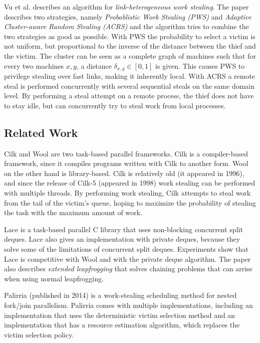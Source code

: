 Vu et al. \cite{6846471} describes an algorithm for \emph{link-heterogeneous work stealing}. The paper describes two strategies, namely \emph{Probablistic Work Stealing (PWS)} and \emph{Adaptive Cluster-aware Random Stealing (ACRS)} and the algorithm tries to combine the two strategies as good as possible. With PWS the probability to select a victim is not uniform, but proportional to the inverse of the distance between the thief and the victim. The cluster can be seen as a complete graph of machines such that for every two machines $x, y$, a distance $\delta_{x,y} \in [0, 1]$ is given. This causes PWS to privilege stealing over fast links, making it inherently local. With ACRS a remote steal is performed concurrently with several sequential steals on the same domain level. By performing a steal attempt on a remote process, the thief does not have to stay idle, but can concurrently try to steal work from local processes. 

\subsection{Related Work}
Cilk and Wool \cite{blumofe1996cilk, faxen2009wool} are two task-based parallel frameworks. Cilk is a compiler-based framework, since it compiles programs written with Cilk to another form. Wool on the other hand is library-based. Cilk is relatively old (it appeared in 1996), and since the release of Cilk-5 \cite{frigo1998implementation} (appeared in 1998) work stealing can be performed with multiple threads. By performing work stealing, Cilk attempts to steal work from the tail of the victim's queue, hoping to maximize the probability of stealing the task with the maximum amount of work.

Lace \cite{lace} is a task-based parallel C library that uses non-blocking concurrent split deques. Lace also gives an implementation with private deques, because they solve some of the limitations of concurrent split deques. Experiments show that Lace is competitive with Wool and with the private deque algorithm. The paper also describes \emph{extended leapfrogging} that solves chaining problems that can arrise when using normal leapfrogging.

Palirria \cite{varisteas2014palirria} (published in 2014) is a work-stealing scheduling method for nested fork/join parallelism. Palirria comes with multiple implementations, including an implementation that uses the deterministic victim selection method and an implementation that has a resource estimation algorithm, which replaces the victim selection policy.

